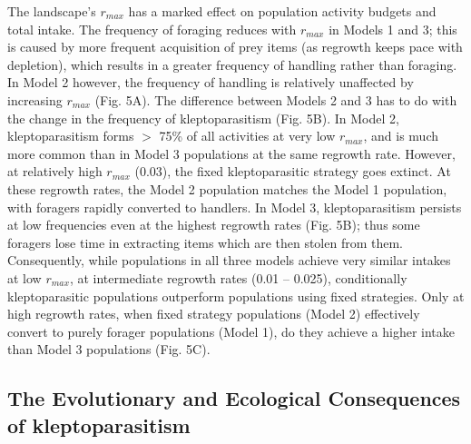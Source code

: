 \documentclass[11pt]{article}
\begin{document}
The landscape's $r_{max}$ has a marked effect on population activity budgets and total intake.
The frequency of foraging reduces with $r_{max}$ in Models 1 and 3; this is caused by more frequent acquisition of prey items (as regrowth keeps pace with depletion), which results in a greater frequency of handling rather than foraging.
In Model 2 however, the frequency of handling is relatively unaffected by increasing $r_{max}$ (Fig. 5A).
The difference between Models 2 and 3 has to do with the change in the frequency of kleptoparasitism (Fig. 5B).
In Model 2, kleptoparasitism forms $>$ 75\% of all activities at very low $r_{max}$, and is much more common than in Model 3 populations at the same regrowth rate.
However, at relatively high $r_{max}$ (0.03), the fixed kleptoparasitic strategy goes extinct.
At these regrowth rates, the Model 2 population matches the Model 1 population, with foragers rapidly converted to handlers.
In Model 3, kleptoparasitism persists at low frequencies even at the highest regrowth rates (Fig. 5B); thus some foragers lose time in extracting items which are then stolen from them.
Consequently, while populations in all three models achieve very similar intakes at low $r_{max}$, at intermediate regrowth rates (0.01 -- 0.025), conditionally kleptoparasitic populations outperform populations using fixed strategies.
Only at high regrowth rates, when fixed strategy populations (Model 2) effectively convert to purely forager populations (Model 1), do they achieve a higher intake than Model 3 populations (Fig. 5C).

\subsection{The Evolutionary and Ecological Consequences of kleptoparasitism}
\end{document}

